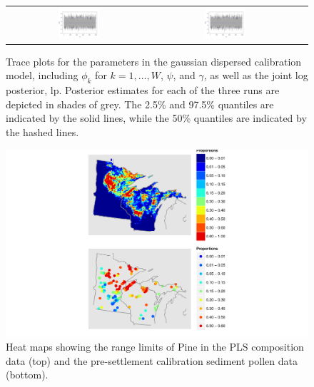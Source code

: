 \begin{figure}
\begin{tabular}{ccc}
  \includegraphics[page=14,width=0.3\textwidth]{figures/cal_trace.pdf} &
  \includegraphics[page=15,width=0.3\textwidth]{figures/cal_trace.pdf} 
\end{tabular}
\caption{Trace plots for the parameters in the gaussian dispersed
  calibration model, including $\phi_k$ for $k=1, \ldots, W$, $\psi$,
  and $\gamma$, as well as the joint log posterior,
  $\text{lp}$. Posterior estimates for each of the three runs are
  depicted in shades of grey. The 2.5\% and 97.5\% quantiles are
  indicated by the solid lines, while the 50\% quantiles are indicated
  by the hashed lines.}
\label{fig:trace}
\end{figure}

\begin{figure}
\centering
\includegraphics[width=7in]{figures/maps_compare_PINE.pdf}
\caption{Heat maps showing the range limits of Pine in the PLS
  composition data (top) and the pre-settlement calibration sediment
  pollen data (bottom).}
\label{fig:compare_maps_PINE}
\end{figure}

